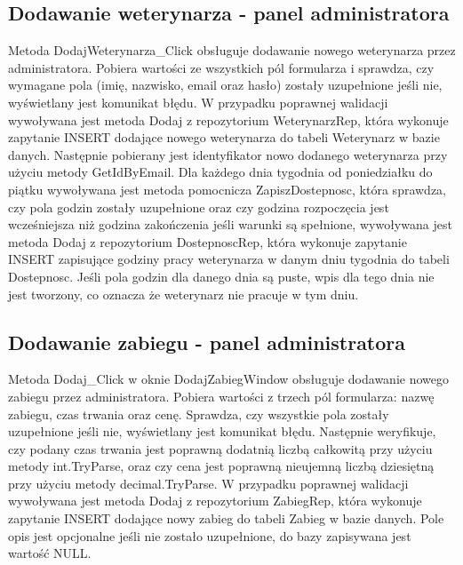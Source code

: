 

\subsection{Dodawanie weterynarza - panel administratora}

Metoda DodajWeterynarza\_Click obsługuje dodawanie nowego weterynarza przez administratora. Pobiera wartości ze wszystkich 
pól formularza i sprawdza, czy wymagane pola (imię, nazwisko, email oraz hasło) zostały uzupełnione jeśli nie, wyświetlany jest 
komunikat błędu. W przypadku poprawnej walidacji wywoływana jest metoda Dodaj z repozytorium WeterynarzRep, 
która wykonuje zapytanie INSERT dodające nowego weterynarza do tabeli Weterynarz w bazie danych. Następnie 
pobierany jest identyfikator nowo dodanego weterynarza przy użyciu metody GetIdByEmail. Dla każdego dnia tygodnia od 
poniedziałku do piątku wywoływana jest metoda pomocnicza ZapiszDostepnosc, która sprawdza, czy pola godzin zostały 
uzupełnione oraz czy godzina rozpoczęcia jest wcześniejsza niż godzina zakończenia jeśli warunki są spełnione, wywoływana 
jest metoda Dodaj z repozytorium DostepnoscRep, która wykonuje zapytanie INSERT zapisujące godziny 
pracy weterynarza w danym dniu tygodnia do tabeli Dostepnosc. Jeśli pola godzin dla danego dnia są puste, wpis dla 
tego dnia nie jest tworzony, co oznacza że weterynarz nie pracuje w tym dniu.



\subsection{Dodawanie zabiegu - panel administratora}

Metoda Dodaj\_Click w oknie DodajZabiegWindow obsługuje dodawanie 
nowego zabiegu przez administratora. Pobiera wartości z trzech pól formularza: nazwę zabiegu, czas trwania oraz cenę. 
Sprawdza, czy wszystkie pola zostały uzupełnione jeśli nie, wyświetlany jest komunikat błędu. Następnie weryfikuje, 
czy podany czas trwania jest poprawną dodatnią liczbą całkowitą przy użyciu metody int.TryParse, oraz czy cena 
jest poprawną nieujemną liczbą dziesiętną przy użyciu metody decimal.TryParse. W przypadku poprawnej walidacji 
wywoływana jest metoda Dodaj z repozytorium ZabiegRep, która wykonuje zapytanie INSERT dodające nowy 
zabieg do tabeli Zabieg w bazie danych. Pole opis jest opcjonalne jeśli nie zostało uzupełnione, do bazy zapisywana 
jest wartość NULL. 

